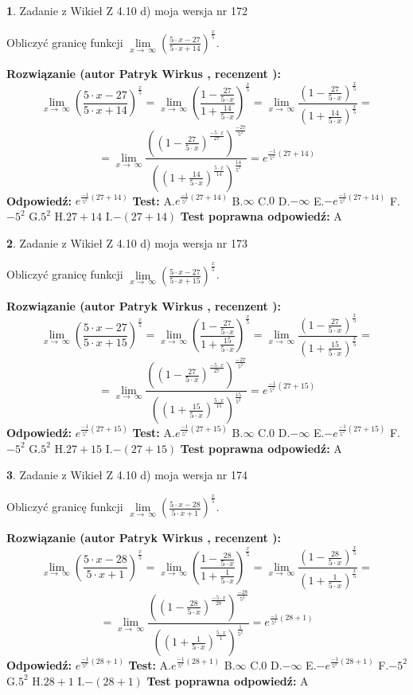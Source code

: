 \documentclass[12pt, a4paper]{article}
\theoremstyle{definition} %
\newtheorem{zad}{}
\newcommand{\zadStart}[1]{\begin{zad}#1\newline}
\newcommand{\zadStop}{\end{zad}}
\newcommand{\rozwStart}[2]{\noindent \textbf{Rozwiązanie (autor #1 , recenzent #2): }\newline}
\newcommand{\rozwStop}{\newline}
\newcommand{\odpStart}{\noindent \textbf{Odpowiedź:}\newline}
\newcommand{\odpStop}{\newline}
\newcommand{\testStart}{\noindent \textbf{Test:}\newline}
\newcommand{\testStop}{\newline}
\newcommand{\kluczStart}{\noindent \textbf{Test poprawna odpowiedź:}\newline}
\newcommand{\kluczStop}{\newline}
\begin{document}
\zadStart{Zadanie z Wikieł Z 4.10 d) moja wersja nr 172}


Obliczyć granicę funkcji  $\lim\limits_{x\to\ \infty}(\frac{5\cdot x-27}{5\cdot x+14})^{\frac{x}{5}}$.
\zadStop
\rozwStart{Patryk Wirkus}{}
$$\lim\limits_{x\to\ \infty}(\frac{5\cdot x-27}{5\cdot x+14})^{\frac{x}{5}} = \lim\limits_{x\to\ \infty}(\frac{1-\frac{27}{5\cdot x}}{1+\frac{14}{5\cdot x}})^{\frac{x}{5}}=\lim\limits_{x\to\ \infty}\frac{(1-\frac{27}{5\cdot x})^{\frac{x}{5}}}{(1+\frac{14}{5\cdot x})^{\frac{x}{5}}}=$$
$$=\lim\limits_{x\to\ \infty}\frac{((1-\frac{27}{5\cdot x})^{\frac{-5\cdot x}{27}})^{\frac{-27}{5^{2}}}}{((1+\frac{14}{5\cdot x})^{\frac{5\cdot x}{14}})^{\frac{14}{5^{2}}}}=e^{\frac{-1}{5^{2}}(27+14)}$$
\rozwStop
\odpStart
$e^{\frac{-1}{5^{2}}(27+14)}$
\odpStop
\testStart
A.$e^{\frac{-1}{5^{2}}(27+14)}$ B.$\infty$ C.$0$ D.$-\infty$ E.$-e^{\frac{-1}{5^{2}}(27+14)}$
F.$-5^{2}$ G.$5^{2}$
H.$27+14$
I.$-(27+14)$
\testStop
\kluczStart
A
\kluczStop



\zadStart{Zadanie z Wikieł Z 4.10 d) moja wersja nr 173}


Obliczyć granicę funkcji  $\lim\limits_{x\to\ \infty}(\frac{5\cdot x-27}{5\cdot x+15})^{\frac{x}{5}}$.
\zadStop
\rozwStart{Patryk Wirkus}{}
$$\lim\limits_{x\to\ \infty}(\frac{5\cdot x-27}{5\cdot x+15})^{\frac{x}{5}} = \lim\limits_{x\to\ \infty}(\frac{1-\frac{27}{5\cdot x}}{1+\frac{15}{5\cdot x}})^{\frac{x}{5}}=\lim\limits_{x\to\ \infty}\frac{(1-\frac{27}{5\cdot x})^{\frac{x}{5}}}{(1+\frac{15}{5\cdot x})^{\frac{x}{5}}}=$$
$$=\lim\limits_{x\to\ \infty}\frac{((1-\frac{27}{5\cdot x})^{\frac{-5\cdot x}{27}})^{\frac{-27}{5^{2}}}}{((1+\frac{15}{5\cdot x})^{\frac{5\cdot x}{15}})^{\frac{15}{5^{2}}}}=e^{\frac{-1}{5^{2}}(27+15)}$$
\rozwStop
\odpStart
$e^{\frac{-1}{5^{2}}(27+15)}$
\odpStop
\testStart
A.$e^{\frac{-1}{5^{2}}(27+15)}$ B.$\infty$ C.$0$ D.$-\infty$ E.$-e^{\frac{-1}{5^{2}}(27+15)}$
F.$-5^{2}$ G.$5^{2}$
H.$27+15$
I.$-(27+15)$
\testStop
\kluczStart
A
\kluczStop



\zadStart{Zadanie z Wikieł Z 4.10 d) moja wersja nr 174}


Obliczyć granicę funkcji  $\lim\limits_{x\to\ \infty}(\frac{5\cdot x-28}{5\cdot x+1})^{\frac{x}{5}}$.
\zadStop
\rozwStart{Patryk Wirkus}{}
$$\lim\limits_{x\to\ \infty}(\frac{5\cdot x-28}{5\cdot x+1})^{\frac{x}{5}} = \lim\limits_{x\to\ \infty}(\frac{1-\frac{28}{5\cdot x}}{1+\frac{1}{5\cdot x}})^{\frac{x}{5}}=\lim\limits_{x\to\ \infty}\frac{(1-\frac{28}{5\cdot x})^{\frac{x}{5}}}{(1+\frac{1}{5\cdot x})^{\frac{x}{5}}}=$$
$$=\lim\limits_{x\to\ \infty}\frac{((1-\frac{28}{5\cdot x})^{\frac{-5\cdot x}{28}})^{\frac{-28}{5^{2}}}}{((1+\frac{1}{5\cdot x})^{\frac{5\cdot x}{1}})^{\frac{1}{5^{2}}}}=e^{\frac{-1}{5^{2}}(28+1)}$$
\rozwStop
\odpStart
$e^{\frac{-1}{5^{2}}(28+1)}$
\odpStop
\testStart
A.$e^{\frac{-1}{5^{2}}(28+1)}$ B.$\infty$ C.$0$ D.$-\infty$ E.$-e^{\frac{-1}{5^{2}}(28+1)}$
F.$-5^{2}$ G.$5^{2}$
H.$28+1$
I.$-(28+1)$
\testStop
\kluczStart
A
\kluczStop
\end{document}
